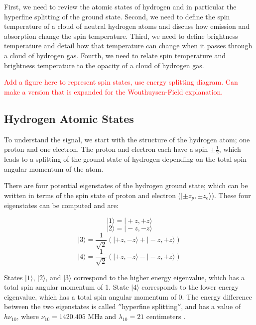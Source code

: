 First, we need to review the atomic states of hydrogen and in particular the \cm hyperfine splitting of the ground state. Second, we need to define the spin temperature of a cloud of neutral hydrogen atoms and discuss how emission and absorption change the spin temperature. Third, we need to define brightness temperature and detail how that temperature can change when it passes through a cloud of hydrogen gas. Fourth, we need to relate spin temperature and brightness temperature to the opacity of a cloud of hydrogen gas. 

\textcolor{red}{Add a figure here to represent spin states, use energy splitting diagram. Can make a version that is expanded for the Wouthuysen-Field explanation.}

\subsection{Hydrogen Atomic States}
To understand the \cm signal, we start with the structure of the hydrogen atom; one proton and one electron. The proton and electron each have a spin $\pm \frac{1}{2}$, which leads to a splitting of the ground state of hydrogen depending on the total spin angular momentum of the atom. 

There are four potential eigenstates of the hydrogen ground state; which can be written in terms of the spin state of proton and electron ($| \pm z_p, \pm z_e \rangle$). These four eigenstates can be computed and are:

\begin{equation}
| 1 \rangle = | + z , + z \rangle 
\end{equation}
\begin{equation}
| 2 \rangle = | - z, - z \rangle 
\end{equation}
\begin{equation}
| 3 \rangle = \frac{1}{\sqrt{2}} (| + z, - z \rangle + |-z, +z \rangle) 
\end{equation}
\begin{equation}
| 4 \rangle = \frac{1}{\sqrt{2}} (| + z, - z \rangle - |-z, +z \rangle)
\end{equation}

States $| 1 \rangle$, $| 2 \rangle$, and $| 3 \rangle$ correspond to the higher energy eigenvalue, which has a total spin angular momentum of 1. State $| 4 \rangle$ corresponds to the lower energy eigenvalue, which has a total spin angular momentum of 0. The energy difference between the two eigenstates is called $''$hyperfine splitting$''$, and has a value of $h \nu_{10}$, where $\nu_{10}=1420.405$ MHz and $\lambda_{10} =  21$ centimeters \cite{townsend2000}. 


